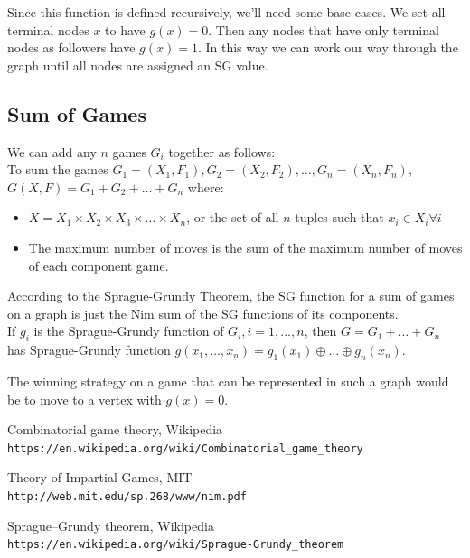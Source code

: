 \documentclass{article}
\begin{document}
Since this function is defined recursively, we’ll need some base cases. We set all terminal nodes $x$ to have $g(x) = 0$. Then any nodes that have only terminal nodes as followers have $g(x) = 1$. In this way we can work our way through the graph until all nodes are assigned an SG value.

\subsection{Sum of Games}
\label{subsec:gameSum}

We can add any $n$ games $G_i$ together as follows:\\
To sum the games $G_1 = (X_1, F_1), G_2 = (X_2, F_2), \dots, G_n = (X_n, F_n)$,\\
$G(X, F) = G_1 + G_2 + \dots + G_n$ where:
\begin{itemize}
\item $X = X_1 \times X_2 \times X_3 \times \dots \times X_n$, or the set of all $n$-tuples such that $x_i \in X_i \forall i$
\item The maximum number of moves is the sum of the maximum number
of moves of each component game.
\end{itemize}

According to the Sprague-Grundy Theorem, the SG function for a sum of games on a graph is just the Nim sum of the SG functions of its components.\\
If $g_i$ is the Sprague-Grundy function of $G_i, i = 1, \dots, n$, then $G = G_1 + \dots + G_n$ has Sprague-Grundy function $g(x_1, \dots, x_n) = g_1(x_1) \oplus \dots \oplus g_n(x_n)$.

The winning strategy on a game that can be represented in such a graph would be to move to a vertex with $g(x) = 0$.

\begin{thebibliography}{9}

Combinatorial game theory, Wikipedia
\\\texttt{https://en.wikipedia.org/wiki/Combinatorial{\_}game{\_}theory}

Theory of Impartial Games, MIT
\\\texttt{http://web.mit.edu/sp.268/www/nim.pdf}

Sprague–Grundy theorem, Wikipedia
\\\texttt{https://en.wikipedia.org/wiki/Sprague-Grundy{\_}theorem}

\end{thebibliography}
\end{document}
